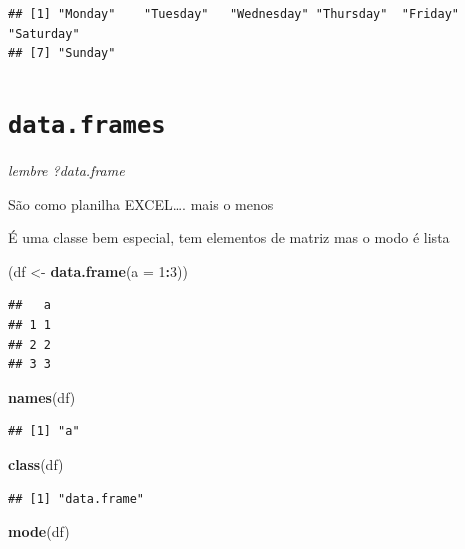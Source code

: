 \documentclass[]{book}
\newenvironment{Shaded}{\begin{snugshade}}{\end{snugshade}}
\newcommand{\KeywordTok}[1]{\textcolor[rgb]{0.13,0.29,0.53}{\textbf{#1}}}
\newcommand{\DataTypeTok}[1]{\textcolor[rgb]{0.13,0.29,0.53}{#1}}
\newcommand{\DecValTok}[1]{\textcolor[rgb]{0.00,0.00,0.81}{#1}}
\newcommand{\StringTok}[1]{\textcolor[rgb]{0.31,0.60,0.02}{#1}}
\newcommand{\OperatorTok}[1]{\textcolor[rgb]{0.81,0.36,0.00}{\textbf{#1}}}
\newcommand{\NormalTok}[1]{#1}
\begin{document}
\begin{verbatim}
## [1] "Monday"    "Tuesday"   "Wednesday" "Thursday"  "Friday"    "Saturday" 
## [7] "Sunday"
\end{verbatim}

\section{\texorpdfstring{\texttt{data.frames}}{data.frames}}\label{data.frames}

\emph{lembre ?data.frame}

São como planilha EXCEL\ldots{}. mais o menos

É uma classe bem especial, tem elementos de matriz mas o modo é lista

\begin{Shaded}
\begin{Highlighting}[]
\NormalTok{(df <-}\StringTok{ }\KeywordTok{data.frame}\NormalTok{(}\DataTypeTok{a =} \DecValTok{1}\OperatorTok{:}\DecValTok{3}\NormalTok{))}
\end{Highlighting}
\end{Shaded}

\begin{verbatim}
##   a
## 1 1
## 2 2
## 3 3
\end{verbatim}

\begin{Shaded}
\begin{Highlighting}[]
\KeywordTok{names}\NormalTok{(df)}
\end{Highlighting}
\end{Shaded}

\begin{verbatim}
## [1] "a"
\end{verbatim}

\begin{Shaded}
\begin{Highlighting}[]
\KeywordTok{class}\NormalTok{(df)}
\end{Highlighting}
\end{Shaded}

\begin{verbatim}
## [1] "data.frame"
\end{verbatim}

\begin{Shaded}
\begin{Highlighting}[]
\KeywordTok{mode}\NormalTok{(df)}
\end{Highlighting}
\end{Shaded}
\end{document}
